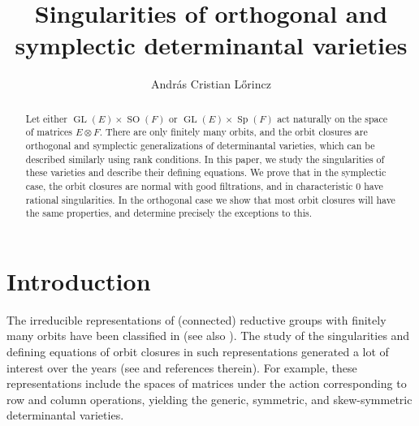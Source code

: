 \documentclass[11pt]{amsart}
\numberwithin{equation}{section}
\theoremstyle{definition}
\DeclareMathOperator{\GL}{GL}
\newcommand{\op}{\operatorname}
\begin{document}
\title{Singularities of orthogonal and symplectic determinantal varieties}

\author{Andr\'as Cristian L\H{o}rincz}
\address{University of Oklahoma, David and Judi Proctor Department of Mathematics, Norman, OK 73019}

\begin{abstract}
Let either $\GL(E)\times \op{SO}(F)$ or $\GL(E)\times \op{Sp}(F)$ act naturally on the space of matrices $E\otimes F$. There are only finitely many orbits, and the orbit closures are orthogonal and symplectic generalizations of determinantal varieties, which can be described similarly using rank conditions. In this paper, we study the singularities of these varieties and describe their defining equations. We prove that in the symplectic case, the orbit closures are normal with good filtrations, and  in characteristic $0$ have rational singularities. In the orthogonal case we show that most orbit closures will have the same properties, and determine precisely the exceptions to this.
\end{abstract}



\maketitle

\setcounter{tocdepth}{2}



\section{Introduction}


The irreducible representations of (connected) reductive groups with finitely many orbits have been classified in \cite{kac} (see also \cite{saki}). The study of the singularities and defining equations of orbit closures in such representations generated a lot of interest over the years (see \cite{weymanbook} and references therein). For example, these representations include the spaces of matrices under the action corresponding to row and column operations, yielding the generic, symmetric, and skew-symmetric determinantal varieties.
\end{document}
